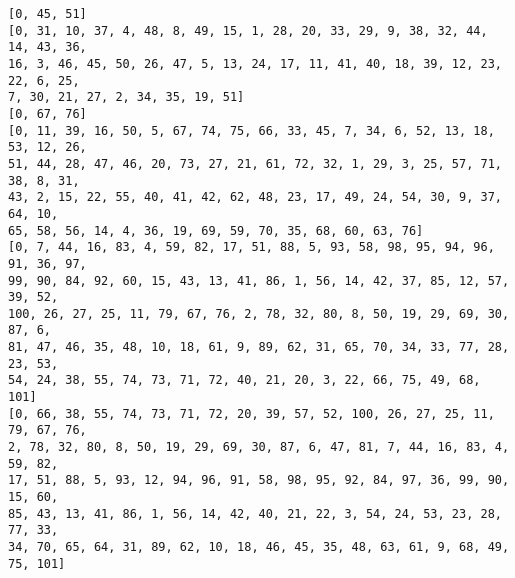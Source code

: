\documentclass[11pt]{article}
\begin{document}
    \begin{Verbatim}[commandchars=\\\{\}]
[0, 45, 51]
[0, 31, 10, 37, 4, 48, 8, 49, 15, 1, 28, 20, 33, 29, 9, 38, 32, 44, 14, 43, 36,
16, 3, 46, 45, 50, 26, 47, 5, 13, 24, 17, 11, 41, 40, 18, 39, 12, 23, 22, 6, 25,
7, 30, 21, 27, 2, 34, 35, 19, 51]
[0, 67, 76]
[0, 11, 39, 16, 50, 5, 67, 74, 75, 66, 33, 45, 7, 34, 6, 52, 13, 18, 53, 12, 26,
51, 44, 28, 47, 46, 20, 73, 27, 21, 61, 72, 32, 1, 29, 3, 25, 57, 71, 38, 8, 31,
43, 2, 15, 22, 55, 40, 41, 42, 62, 48, 23, 17, 49, 24, 54, 30, 9, 37, 64, 10,
65, 58, 56, 14, 4, 36, 19, 69, 59, 70, 35, 68, 60, 63, 76]
[0, 7, 44, 16, 83, 4, 59, 82, 17, 51, 88, 5, 93, 58, 98, 95, 94, 96, 91, 36, 97,
99, 90, 84, 92, 60, 15, 43, 13, 41, 86, 1, 56, 14, 42, 37, 85, 12, 57, 39, 52,
100, 26, 27, 25, 11, 79, 67, 76, 2, 78, 32, 80, 8, 50, 19, 29, 69, 30, 87, 6,
81, 47, 46, 35, 48, 10, 18, 61, 9, 89, 62, 31, 65, 70, 34, 33, 77, 28, 23, 53,
54, 24, 38, 55, 74, 73, 71, 72, 40, 21, 20, 3, 22, 66, 75, 49, 68, 101]
[0, 66, 38, 55, 74, 73, 71, 72, 20, 39, 57, 52, 100, 26, 27, 25, 11, 79, 67, 76,
2, 78, 32, 80, 8, 50, 19, 29, 69, 30, 87, 6, 47, 81, 7, 44, 16, 83, 4, 59, 82,
17, 51, 88, 5, 93, 12, 94, 96, 91, 58, 98, 95, 92, 84, 97, 36, 99, 90, 15, 60,
85, 43, 13, 41, 86, 1, 56, 14, 42, 40, 21, 22, 3, 54, 24, 53, 23, 28, 77, 33,
34, 70, 65, 64, 31, 89, 62, 10, 18, 46, 45, 35, 48, 63, 61, 9, 68, 49, 75, 101]
    \end{Verbatim}


    
    
    
\end{document}
